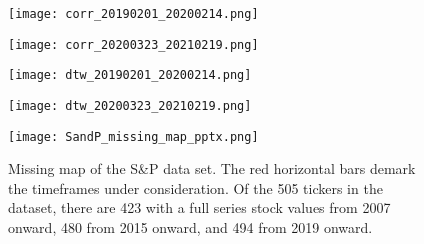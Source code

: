 \documentclass[12pt]{article}
\begin{document}
\begin{figure}
    \centering
    \texttt{[image: corr\_20190201\_20200214.png]}
    \caption{}
    \label{fig:Ng1}

    \bigbreak

    \texttt{[image: corr\_20200323\_20210219.png]}
    \caption{}
    \label{fig:Ng2}
\end{figure}


\begin{figure}
    \centering
    \texttt{[image: dtw\_20190201\_20200214.png]}
    \caption{}
    \label{fig:Ng3}

    \bigbreak

    \texttt{[image: dtw\_20200323\_20210219.png]}
    \caption{}
    \label{fig:Ng4}
\end{figure}


\begin{figure}[!ht]
    \centering
    \texttt{[image: SandP\_missing\_map\_pptx.png]}
    \caption{Missing map of the S\&P data set. The red horizontal bars demark the timeframes under consideration. Of the 505 tickers in the dataset, there are 423 with a full series stock values from 2007 onward, 480 from 2015 onward, and 494 from 2019 onward.}
    \label{fig:SandP_missing_map}
\end{figure}


\printbibliography
\end{document}
